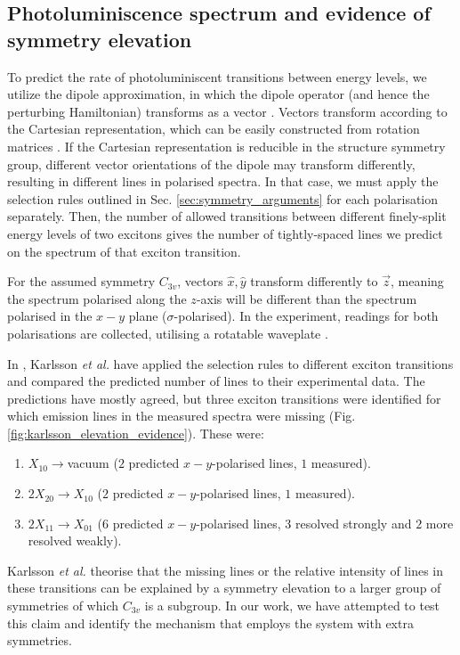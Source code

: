 \subsection[Photoluminiscence spectrum]{Photoluminiscence spectrum and evidence of symmetry elevation}

To predict the rate of photoluminiscent transitions between energy levels, we utilize the dipole approximation, in which the dipole operator (and hence the perturbing Hamiltonian) transforms as a vector \cite[p. 13]{karlsson}. Vectors transform according to the Cartesian representation, which can be easily constructed from rotation matrices \cite[p. 160]{wigner}. If the Cartesian representation is reducible in the structure symmetry group, different vector orientations of the dipole may transform differently, resulting in different lines in polarised spectra. In that case, we must apply the selection rules outlined in Sec. \ref{sec:symmetry_arguments} for each polarisation separately. Then, the number of allowed transitions between different finely-split energy levels of two excitons gives the number of tightly-spaced lines we predict on the spectrum of that exciton transition.

For the assumed symmetry $C_{3v}$, vectors $\hat{x},\hat{y}$ transform differently to $\vec{z}$, meaning the spectrum polarised along the $z$-axis will be different than the spectrum polarised in the $x-y$ plane ($\sigma$-polarised). In the experiment, readings for both polarisations are collected, utilising a rotatable waveplate \cite[p. 2]{karlsson}.

In \cite{karlsson}, Karlsson \textit{et al.} have applied the selection rules to different exciton transitions and compared the predicted number of lines to their experimental data. The predictions have mostly agreed, but three exciton transitions were identified for which emission lines in the measured spectra were missing (Fig. \ref{fig:karlsson_elevation_evidence}). These were:
\begin{enumerate}
\item $X_{10}\to $vacuum ($2$ predicted $x-y$-polarised lines, $1$ measured).
\item $2X_{20}\to X_{10}$ ($2$ predicted $x-y$-polarised lines, $1$ measured).
\item $2X_{11}\to X_{01}$ ($6$ predicted $x-y$-polarised lines, $3$ resolved strongly and $2$ more resolved weakly).
\end{enumerate}
Karlsson \textit{et al.} theorise that the missing lines or the relative intensity of lines in these transitions can be explained by a symmetry elevation to a larger group of symmetries of which $C_{3v}$ is a subgroup. In our work, we have attempted to test this claim and identify the mechanism that employs the system with extra symmetries.

